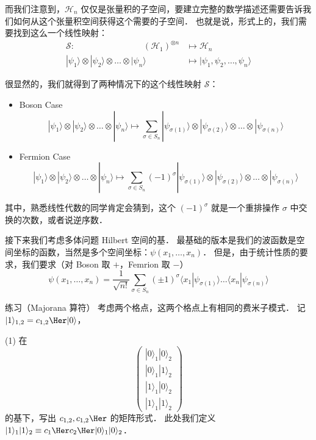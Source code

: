 而我们注意到，$\mathcal{H}_n$ 仅仅是张量积的子空间，要建立完整的数学描述还需要告诉我们如何从这个张量积空间获得这个需要的子空间． 也就是说，形式上的，我们需要找到这么一个线性映射：
\begin{align}
\mathcal{S}:\quad\quad\quad\quad\quad\quad\quad\quad (\mathcal{H}_1)^{\otimes n}&\mapsto\mathcal{H}_n\\
|\psi_1\rangle\otimes|\psi_2\rangle\otimes\dots\otimes|\psi_n\rangle &\mapsto|\psi_1,\psi_2,\dots,\psi_n\rangle
\end{align}

很显然的，我们就得到了两种情况下的这个线性映射 $\mathcal{S}$：
\begin{itemize}
\item Boson Case
\begin{equation}
|\psi_1\rangle\otimes|\psi_2\rangle\otimes\dots\otimes|\psi_n\rangle \mapsto \sum_{{\sigma}\in S_n}|\psi_{\sigma(1)}\rangle\otimes|\psi_{\sigma(2)}\rangle\otimes\dots\otimes|\psi_{\sigma(n)}\rangle
\end{equation}
\item Fermion Case
\begin{equation}
|\psi_1\rangle\otimes|\psi_2\rangle\otimes\dots\otimes|\psi_n\rangle \mapsto \sum_{{\sigma}\in S_n}(-1)^{\sigma}|\psi_{\sigma(1)}\rangle\otimes|\psi_{\sigma(2)}\rangle\otimes\dots\otimes|\psi_{\sigma(n)}\rangle
\end{equation}
\end{itemize}

其中，熟悉线性代数的同学肯定会猜到，这个 $(-1)^{\sigma}$ 就是一个重排操作 $\sigma$ 中交换的次数，或者说逆序数．

接下来我们考虑多体问题 Hilbert 空间的基． 最基础的版本是我们的波函数是空间坐标的函数，当然是多个空间坐标：$\psi(x_1,\dots,x_n)$． 但是，由于统计性质的要求，我们要求（对 Boson 取 $+$，Femrion 取 $-$）
\begin{equation}
\psi(x_1,\dots,x_n)=\frac{1}{\sqrt{n!}}\sum_{\sigma\in S_n}(\pm1)^\sigma\langle x_1|\psi_{\sigma(1)}\rangle\dots\langle x_n|\psi_{\sigma(n)}\rangle
\end{equation}

\begin{exer}{练习（Majorana 算符）}
考虑两个格点，这两个格点上有相同的费米子模式． 记 $|1\rangle_{1,2}=c_{1,2}\Her|0\rangle$，

(1) 在
\begin{equation}
\left(\begin{matrix}|0\rangle_1|0\rangle_2\\|0\rangle_1|1\rangle_2\\|1\rangle_1|0\rangle_2\\|1\rangle_1|1\rangle_2\end{matrix}\right) 
\end{equation}
的基下，写出 $c_{1,2}, c_{1,2}\Her$ 的矩阵形式． 此处我们定义 $|1\rangle_1|1\rangle_2\equiv c_1\Her c_2\Her|0\rangle_1|0\rangle_2$．
\end{exer}